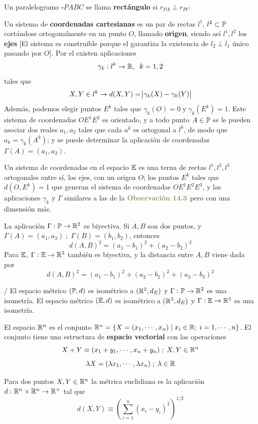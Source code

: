  Un paralelogramo $\square PABC$ se llama \textbf{rectángulo} si $r_{PA} \perp r_{PC}$


 Un sistema de \textbf{coordenadas cartesianas} es un par de rectas $l^1$, $l^2 \subset \P$ cortándose ortogonalmente en un punto $O$, llamado \textbf{origen}, siendo así $l^1,l^2$ los \textbf{ejes} [El sistema es construible porque el  garantiza la existencia de $l_2 \perp l_1$ único pasando por $O$].
Por el  existen aplicaciones
$$\gamma_k: l^k \rightarrow \R, \;\; k = 1,2$$
tales que 
$$X,Y \in l^k \rightarrow d(X,Y) = \abs{\gamma_k(X) - \gamma_k(Y)}$$
Además, podemos elegir puntos $E^k$ tales que $\gamma_k(O) = 0\;\text{y}\; \gamma_k(E^k)=1$.
Este sistema de coordenadas $OE^1E^2$ es orientado, y a todo punto $A \in \P$ se le pueden asociar dos reales $a_1, a_2$ tales que cada $a^k$ es ortogonal a $l^k$, de modo que $a_k = \gamma_k(A^k)$; y se puede determinar la aplicación de coordenadas $\Gamma(A) = (a_1,a_2)$.



\obs{[Coordenadas en $\E$]} Un sistema de coordenadas en el espacio $\E$ es una terna de rectas $l^1,l^2,l^3$ ortogonales entre sí, los ejes, con un origen $O$; los puntos $E^k$ tales que $d(O, E^k) = 1$ que generan el sistema de coordenadas $OE^1E^2E^3$, y las aplicaciones $\gamma_k$ y $\Gamma$ similares a las de la $\obs{14.3}$ pero con una dimensión más. 

 La aplicación $\Gamma:\P\rightarrow \R^2$ es biyectiva. Si $A,B$ son dos puntos, y $\Gamma(A) = (a_1,a_2)\;;\;\Gamma(B) = (b_1,b_2)$, entonces 
$$d(A,B)^2 = (a_1-b_1)^2+(a_2-b_2)^2$$
Para $\E$, $\Gamma:\E\rightarrow \R^3$ también es biyectiva, y la distancia entre $A, B$ viene dada por 
$$d(A,B)^2 = (a_1-b_1)^2+(a_2-b_2)^2+(a_3-b_3)^2$$

/ El espacio métrico $(\P,d)$ es isométrico a $(\R^2,d_E)$ y $\Gamma:\P\rightarrow\R^2$ es una isometría. El espacio métrico $(\E,d)$ es isométrico a $(\R^3,d_E)$ y $\Gamma:\E\rightarrow\R^3$ es una isometría.

 El espacio $\R^n$ es el conjunto $\R^n = \{X=(x_1, \cdots, x_n) \; | \; x_i \in \R;\; i = 1,\cdots, n \}$. El conjunto tiene una estructura de \textbf{espacio vectorial} con las operaciones
\[X+Y \equiv (x_1+y_1,\cdots, x_n+y_n) \;;\; X,Y \in \R^n \]
\[\lambda X = (\lambda x_1, \cdots, \lambda x_n) \;;\; \lambda \in \R \]

 Para dos puntos $X,Y \in \R^n$ la métrica euclidiana es la aplicación  $d: \R^n \times \R^n \rightarrow \R^+$ tal que
$$d(X,Y) \equiv \left(\sum_{i = 1}^{n}(x_i-y_i)^2\right) ^{1/2}$$


